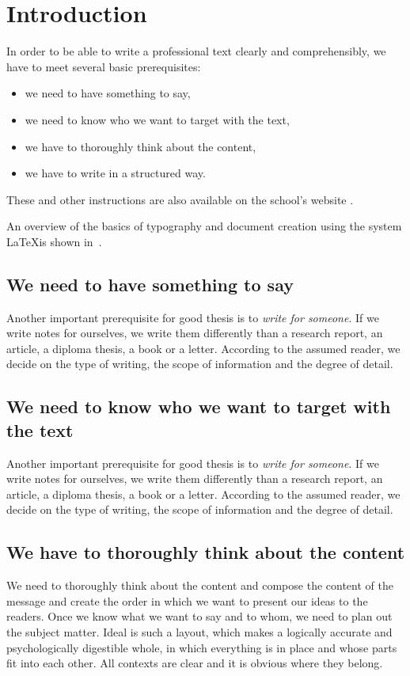 
\chapter{Introduction}
In order to be able to write a professional text clearly and comprehensibly, we have to meet several basic 	
prerequisites:
\begin{itemize}
\item we need to have something to say,
\item we need to know who we want to target with the text,
\item we have to thoroughly think about the content,
\item we have to write in a structured way. 
\end{itemize}

These and other instructions are also available on the school's website \cite{fitWeb}.

An overview of the basics of typography and document creation using the system \LaTeX is shown in~\cite{Rybicka}.

\section{We need to have something to say}
Another important prerequisite for good thesis is to {\it write for someone}. If we write notes for ourselves, we write them differently than a research report, an article, a diploma thesis, a book or a letter. According to the assumed reader, we decide on the type of writing, the scope of information and the degree of detail.

\section{We need to know who we want to target with the text}
Another important prerequisite for good thesis is to {\it write for someone}. If we write notes for ourselves, we write them differently than a research report, an article, a diploma thesis, a book or a letter. According to the assumed reader, we decide on the type of writing, the scope of information and the degree of detail.

\section{We have to thoroughly think about the content}
We need to thoroughly think about the content and compose the content of the message and create the order in which we want to present our ideas to the readers. Once we know what we want to say and to whom, we need to plan out the subject matter. Ideal is such a layout, which makes a logically accurate and psychologically digestible whole, in which everything is in place and whose parts fit into each other. All contexts are clear and it is obvious where they belong.

